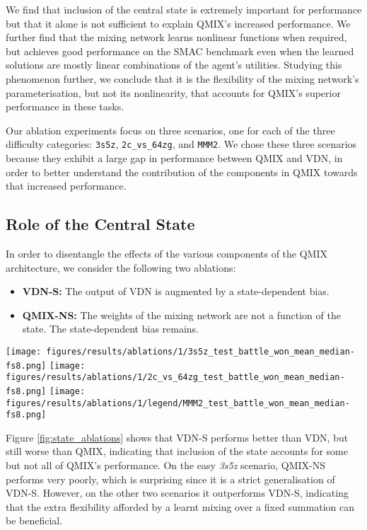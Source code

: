 \documentclass[twoside,11pt]{article}
\begin{document}
We find that inclusion of the central state is extremely important for 
performance but that it alone is not sufficient to explain QMIX's increased 
performance.
We further find that the mixing network learns nonlinear functions when 
required, but achieves good performance on the SMAC benchmark even when the 
learned solutions are mostly linear combinations of the agent's utilities.
Studying this phenomenon further, we conclude that it is the flexibility of the 
mixing network's parameterisation, but not its nonlinearity, that accounts for 
QMIX's superior performance in these tasks.

Our ablation experiments focus on three scenarios, one for each of the three difficulty categories: \texttt{3s5z}, \texttt{2c\_vs\_64zg}, and \texttt{MMM2}.
We chose these three scenarios because they exhibit a large gap in performance between QMIX and VDN, in order to better understand the contribution of the components in QMIX towards that increased performance.

\subsection{Role of the Central State}

In order to disentangle the effects of the various components of the QMIX architecture, we consider the following two ablations:

\begin{itemize}
    \item \textbf{VDN-S:} The output of VDN is augmented by a state-dependent bias.
    \item \textbf{QMIX-NS:} The weights of the mixing network are not a function of the state. The state-dependent bias remains.
\end{itemize}


\begin{figure*}[h!]
    \centering
    \texttt{[image: figures/results/ablations/1/3s5z\_test\_battle\_won\_mean\_median-fs8.png]}
    \texttt{[image: figures/results/ablations/1/2c\_vs\_64zg\_test\_battle\_won\_mean\_median-fs8.png]}
    \texttt{[image: figures/results/ablations/1/legend/MMM2\_test\_battle\_won\_mean\_median-fs8.png]}
    \caption{Ablations for state experiments.}
    \label{fig:state_ablations}
\end{figure*}

Figure \ref{fig:state_ablations} shows that VDN-S performs better than VDN, but still worse than QMIX, indicating that inclusion of the state accounts for some but not all of QMIX's performance. 
On the easy \textit{3s5z} scenario, QMIX-NS performs very poorly, which is surprising since it is a strict generalisation of VDN-S. 
However, on the other two scenarios it outperforms VDN-S, indicating that the extra flexibility afforded by a learnt mixing over a fixed summation can be beneficial. 
\end{document}
